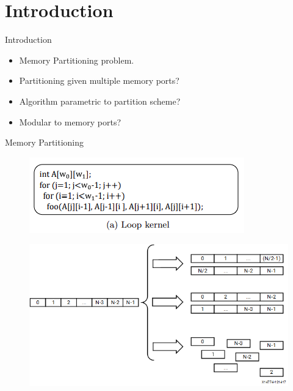 \documentclass[xcolor=dvipsnames]{beamer}
\begin{document}
    \section{Introduction}
    \begin{frame}{Introduction}

        \begin{itemize}
            \item Memory Partitioning problem.
            \item Partitioning given multiple memory ports?
            \item Algorithm parametric to partition scheme?
            \item Modular to memory ports?
        \end{itemize}
        
    \end{frame}

    \begin{frame}{Memory Partitioning}

        \begin{figure}
            \includegraphics{LoopExample.PNG}
        \end{figure}

        \begin{figure}
            \includegraphics[scale=0.6]{MemPaart.png}
        \end{figure}
        
    \end{frame}
\end{document}
